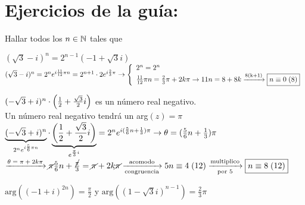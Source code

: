 \documentclass[12pt,a4paper, spanish]{article}
\begin{document}
\ejercicio

\newpage


\section*{Ejercicios de la guía:}
\setcounter{ejercicio}{0} %

\ejercicio

\setcounter{ejercicio}{6}

\ejercicio
Hallar todos los $n \in \mathbb N$ tales que
\begin{enumerate}[label=\roman*)]
	\begin{minipage}{0.7\textwidth}
		\item $(\sqrt3 -i)^n = 2^{n-1}(-1 + \sqrt3 i)$ \\
		\separadorCorto
		$(\sqrt3 -i)^n = 2^n e^{i\frac{11}{12}\pi n} = 2^{n+1}\cdot 2e^{i \frac{2}{3} \pi}\\
			\to
			\llave{l}{
				2^n = 2^n\\
				\frac{11}{12}\pi n = \frac{2}{3}\pi + 2k \pi \to 11n = 8+8k \flecha{8(k+1)} \boxed{\congruencia{n}{0}{8}}
			}$
	\end{minipage}

	\item $(-\sqrt3 + i)^n \cdot \left( \frac{1}{2} + \frac{\sqrt3}{2}i \right)$ es un número real negativo.\\
	      \separadorCorto
	      Un número real negativo tendrá un arg$(z) = \pi$\\
	      $\underbrace{(-\sqrt3 + i)^n}_{2^ne^{i\frac{5}{6}\pi n}} \cdot \underbrace{\left( \frac{1}{2} + \frac{\sqrt3}{2}i \right)}_{e^{\frac{\pi}{3}i}} =
		      2^ne^{i(\frac{5}{6}n + \frac{1}{3}) \pi} \to \theta = (\frac{5}{6}n + \frac{1}{3}) \pi $\\
	      $\flecha{$\theta = \pi + 2k\pi$}
		      \cancel\pi \frac{5}{6}n + \frac{\cancel\pi}{3} = \cancel\pi + 2k\cancel\pi
		      \flecha{acomodo}[congruencia]
		      \congruencia{5n}{4}{12}
		      \flecha{multiplico}[por 5]
		      \boxed{\congruencia{n}{8}{12}} $

	\item $\text{arg}((-1+i)^{2n}) = \frac{\pi}{2}$ y $\text{arg}((1-\sqrt3 i)^{n-1}) = \frac{2}{3}\pi$
	      \separadorCorto
\end{enumerate}
\end{document}
